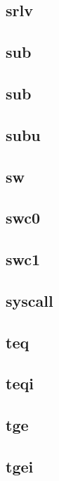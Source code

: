 \documentclass{article}
\begin{document}
\subsection*{srlv}

\subsection*{sub}

\subsection*{sub}

\subsection*{subu}

\subsection*{sw}

\subsection*{swc0}

\subsection*{swc1}

\subsection*{syscall}

\subsection*{teq}

\subsection*{teqi}

\subsection*{tge}

\subsection*{tgei}
\end{document}
